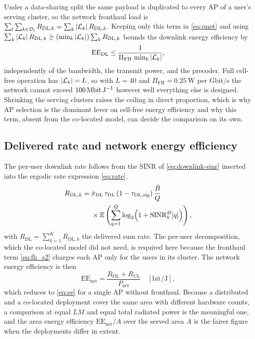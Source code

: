 \begin{remark}
\label{rem:fh_ceiling}
Under a data-sharing split the same payload is duplicated to every AP of a user's
serving cluster, so the network fronthaul load is
$\sum_{l}\sum_{k\in\mathcal{D}_{l}}R_{\mathrm{DL},k}=
\sum_{k}\left\lvert\mathcal{L}_{k}\right\rvert R_{\mathrm{DL},k}$. Keeping only this term in
\eqref{eq:pnet} and using $\sum_{k}\left\lvert\mathcal{L}_{k}\right\rvert R_{\mathrm{DL},k}\geq
(\min_{k}\left\lvert\mathcal{L}_{k}\right\rvert)\sum_{k}R_{\mathrm{DL},k}$ bounds the downlink
energy efficiency by
\begin{equation}
\label{eq:ee_ceiling}
\mathrm{EE}_{\mathrm{DL}} \leq
\frac{1}{\Pi_{\mathrm{FH}}\,\min_{k}\left\lvert\mathcal{L}_{k}\right\rvert},
\end{equation}
independently of the bandwidth, the transmit power, and the precoder. Full
cell-free operation has $\left\lvert\mathcal{L}_{k}\right\rvert=L$, so with $L=40$ and
$\Pi_{\mathrm{FH}}=\SI{0.25}{\watt}$ per Gbit/s the network cannot exceed
$\SI{100}{\mega\bit\per\joule}$ however well everything else is designed.
Shrinking the serving clusters raises the ceiling in direct proportion, which is
why AP selection is the dominant lever on cell-free energy efficiency and why
this term, absent from the co-located model, can decide the comparison on its own.
\end{remark}

\subsection{Delivered rate and network energy efficiency}
\label{ssec:dmimo_ee}

The per-user downlink rate follows from the SINR of \eqref{eq:downlink-sinr}
inserted into the ergodic rate expression \eqref{eq:rate},
\begin{align}
\label{eq:rate_user}
R_{\mathrm{DL},k} ={}& \bar x_{\mathrm{DL}}\,\tau_{\mathrm{DL}}\,
(1-\tau_{\mathrm{DL,sig}})\,\frac{\tilde B}{Q} \nonumber\\
&\times \mathbb{E}\left(\sum_{q=1}^{Q}\log_{2}\!\left(1
+\mathrm{SINR}_{k}^{\mathrm{dl}}[q]\right)\right),
\end{align}
with $R_{\mathrm{DL}}=\sum_{k=1}^{K}R_{\mathrm{DL},k}$ the delivered sum rate.
The per-user decomposition, which the co-located model did not need, is required
here because the fronthaul term \eqref{eq:fh_s2} charges each AP only for the
users in its cluster. The network energy efficiency is then
\begin{equation}
\label{eq:ee_net}
\mathrm{EE}_{\mathrm{net}} =
\frac{R_{\mathrm{DL}} + R_{\mathrm{UL}}}{P_{\mathrm{net}}}
\quad[\mathrm{bit/J}],
\end{equation}
which reduces to \eqref{eq:ee} for a single AP without fronthaul. Because a
distributed and a co-located deployment cover the same area with different
hardware counts, a comparison at equal $L M$ and equal total radiated power is
the meaningful one, and the area energy efficiency
$\mathrm{EE}_{\mathrm{net}}/A$ over the served area $A$ is the fairer figure when
the deployments differ in extent.

